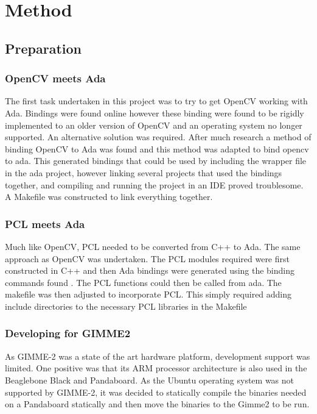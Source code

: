 \section{Method}\label{sec:method}
\subsection{Preparation}
\subsubsection{OpenCV meets Ada}
The first task undertaken in this project was to try to get OpenCV working with Ada. Bindings were found online \cite{web:oldAdaBindings} however these binding were found to be rigidly implemented to an older version of OpenCV and an operating system no longer supported. An alternative solution was required. After much research a method of binding OpenCV to Ada was found \cite{web:newAdaBindings} and this method was adapted to bind opencv to ada. This generated bindings that could be used by including the wrapper file in the ada project, however linking several projects that used the bindings together, and compiling and running the project in an IDE proved troublesome. A Makefile was constructed to link everything together.

\subsubsection{PCL meets Ada}
Much like OpenCV, PCL needed to be converted from C++ to Ada. The same approach as OpenCV was undertaken. The PCL modules required were first constructed in C++ and then Ada bindings were generated using the binding commands found \cite{web:newAdaBindings}. The PCL functions could then be called from ada. The makefile was then adjusted to incorporate PCL. This simply required adding include directories to the necessary PCL libraries in the Makefile 

\subsubsection{Developing for GIMME2}
As GIMME-2 was a state of the art hardware platform, development support was limited. One positive was that its ARM processor architecture is also used in the Beaglebone Black and Pandaboard. As the Ubuntu operating system was not supported by GIMME-2, it was decided to statically compile the binaries needed on a Pandaboard statically and then move the binaries to the Gimme2 to be run.

